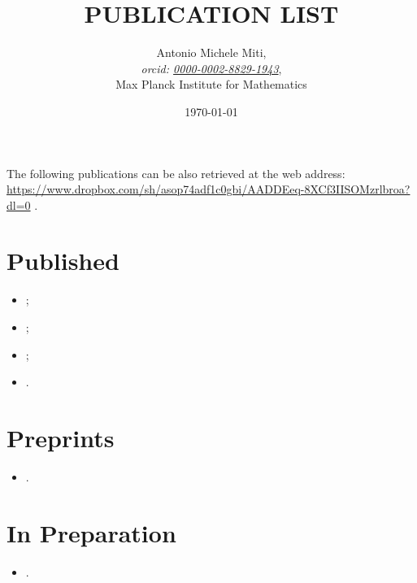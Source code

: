 \documentclass{article}
\title{PUBLICATION LIST}
\date{\today}
\author{
	Antonio Michele Miti,\\
	\emph{orcid: \href{https://orcid.org/0000-0002-8829-1943}{0000-0002-8829-1943}},
	\\Max Planck Institute for Mathematics
}
\begin{document}
  

	\maketitle

	\noindent
  The following publications can be also retrieved at the web address:
  \\ 
  \url{https://www.dropbox.com/sh/asop74adf1c0gbi/AADDEeq-8XCf3IISOMzrlbroa?dl=0}
  .


  \section*{Published}
	  \begin{itemize}
 	   \item {};
 	   \item {};
 	   \item {};
 	   \item {}.
	  \end{itemize}




  \section*{Preprints}
	  \begin{itemize}
    	   \item {}.
	  \end{itemize}
  
  \section*{In Preparation}
	  \begin{itemize}
 	   \item {}.
	  \end{itemize}

  
\end{document}

